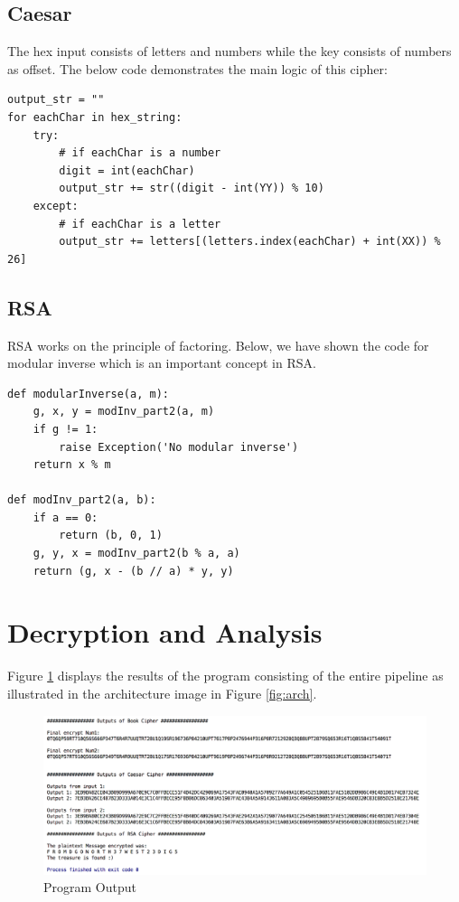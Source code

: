 \documentclass[12pt]{article}
\begin{document}
\subsection{Caesar}
The hex input consists of letters and numbers while the key consists of numbers as offset. The below code demonstrates the main logic of this cipher:
\begin{lstlisting}
output_str = ""
for eachChar in hex_string:
    try:
    	# if eachChar is a number
        digit = int(eachChar)
        output_str += str((digit - int(YY)) % 10)
    except:
    	# if eachChar is a letter
        output_str += letters[(letters.index(eachChar) + int(XX)) % 26]
\end{lstlisting}
\subsection{RSA}
RSA works on the principle of factoring. Below, we have shown the code for modular inverse which is an important concept in RSA. 
\begin{lstlisting}
def modularInverse(a, m):
    g, x, y = modInv_part2(a, m)
    if g != 1:
        raise Exception('No modular inverse')
    return x % m

def modInv_part2(a, b):
    if a == 0:
        return (b, 0, 1)
    g, y, x = modInv_part2(b % a, a)
    return (g, x - (b // a) * y, y)
\end{lstlisting}

\section{Decryption and Analysis}
Figure \ref{fig:output} displays the results of the program consisting of the entire pipeline as illustrated in the architecture image in Figure \ref{fig:arch}. 
\begin{figure}[h]
  \includegraphics[scale=0.52]{output}
  \caption{Program Output}
  \label{fig:output}
\end{figure}
\end{document}
